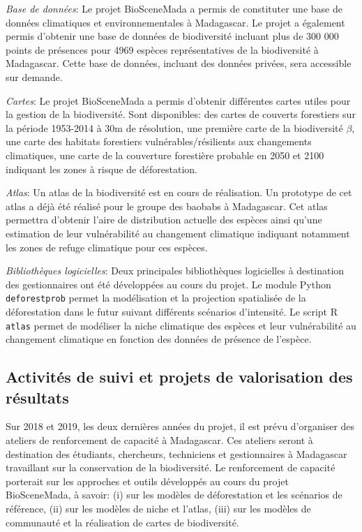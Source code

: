 \documentclass[12pt,]{article}
\begin{document}
\emph{Base de données}: Le projet BioSceneMada a permis de constituter
une base de données climatiques et environnementales à Madagascar. Le
projet a également permis d'obtenir une base de données de biodiversité
incluant plus de 300 000 points de présences pour 4969 espèces
représentatives de la biodiversité à Madagascar. Cette base de données,
incluant des données privées, sera accessible sur demande.

\emph{Cartes}: Le projet BioSceneMada a permis d'obtenir différentes
cartes utiles pour la gestion de la biodiversité. Sont disponibles: des
cartes de couverts forestiers sur la période 1953-2014 à 30m de
résolution, une première carte de la biodiversité \(\beta\), une carte
des habitats forestiers vulnérables/résilients aux changements
climatiques, une carte de la couverture forestière probable en 2050 et
2100 indiquant les zones à risque de déforestation.

\emph{Atlas}: Un atlas de la biodiversité est en cours de réalisation.
Un prototype de cet atlas a déjà été réalisé pour le groupe des baobabs
à Madagascar. Cet atlas permettra d'obtenir l'aire de distribution
actuelle des espèces ainsi qu'une estimation de leur vulnérabilité au
changement climatique indiquant notamment les zones de refuge climatique
pour ces espèces.

\emph{Bibliothèques logicielles}: Deux principales bibliothèques
logicielles à destination des gestionnaires ont été développées au cours
du projet. Le module Python \texttt{deforestprob} permet la modélisation
et la projection spatialisée de la déforestation dans le futur suivant
différents scénarios d'intensité. Le script R \texttt{atlas} permet de
modéliser la niche climatique des espèces et leur vulnérabilité au
changement climatique en fonction des données de présence de l'espèce.

\hypertarget{activites-de-suivi-et-projets-de-valorisation-des-resultats}{%
\subsection{Activités de suivi et projets de valorisation des
résultats}\label{activites-de-suivi-et-projets-de-valorisation-des-resultats}}

Sur 2018 et 2019, les deux dernières années du projet, il est prévu
d'organiser des ateliers de renforcement de capacité à Madagascar. Ces
ateliers seront à destination des étudiants, chercheurs, techniciens et
gestionnaires à Madagascar travaillant sur la conservation de la
biodiversité. Le renforcement de capacité porterait sur les approches et
outils développés au cours du projet BioSceneMada, à savoir: (i) sur les
modèles de déforestation et les scénarios de référence, (ii) sur les
modèles de niche et l'atlas, (iii) sur les modèles de communauté et la
réalisation de cartes de biodiversité.
\end{document}
